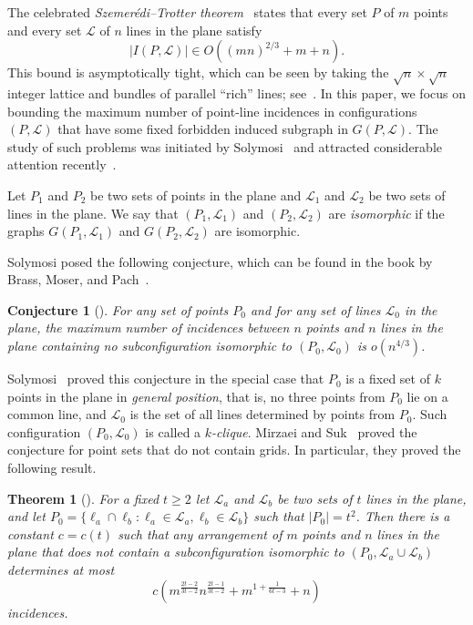\documentclass{article}
\newtheorem{theorem}{Theorem}
\newtheorem{conjecture}{Conjecture}
\begin{document}
The celebrated \emph{Szemer\'edi--Trotter theorem}~\cite{szemTro83} states that every set $P$ of $m$ points and every set $\mathcal{L}$ of $n$ lines in the plane satisfy
\[|I(P,\mathcal{L})| \in O((mn)^{2/3}+m+n).\]
This bound is asymptotically tight, which can be seen by taking the $\sqrt{n} \times \sqrt{n}$ integer lattice
and bundles of parallel ``rich'' lines; see~\cite{pachAga95}.
In this paper, we focus on bounding the maximum number of point-line incidences in configurations $(P,\mathcal{L})$ that have some fixed forbidden induced subgraph in $G(P,\mathcal{L})$.
The study of such problems was initiated by Solymosi~\cite{solymosi06} and attracted considerable attention recently~\cite{mirSuk21,mirSukVer19,tomSuk21,sukZeng23}.

Let $P_1$ and $P_2$ be two sets of points in the plane and $\mathcal{L}_1$ and $\mathcal{L}_2$ be two sets of lines in the plane.
We say that $(P_1,\mathcal{L}_1)$ and $(P_2,\mathcal{L}_2)$ are \emph{isomorphic} if the graphs $G(P_1,\mathcal{L}_1)$ and $G(P_2,\mathcal{L}_2)$ are isomorphic.

Solymosi posed the following conjecture, which can be found in the book by Brass, Moser, and Pach~\cite[p.~291]{bmp05}.

\begin{conjecture}[\cite{bmp05}]
\label{conj-Solymosi}
For any set of points $P_0$ and for any set of lines $\mathcal{L}_0$ in the plane, the maximum number of incidences between $n$ points and $n$ lines in the plane containing no subconfiguration isomorphic to $(P_0,\mathcal{L}_0)$ is $o(n^{4/3})$.
\end{conjecture}

Solymosi~\cite{solymosi06} proved this conjecture in the special case that $P_0$ is a fixed set of
$k$ points in the plane in \emph{general position}, that is, no three points from $P_0$ lie on a common line, and $\mathcal{L}_0$ is the set of all lines determined by points from $P_0$.
Such configuration $(P_0,\mathcal{L}_0)$ is called a \emph{$k$-clique}. 
Mirzaei and Suk~\cite{mirSuk21} proved the conjecture for point sets that do not contain grids. 
In particular, they proved the following result.

\begin{theorem}[\cite{mirSuk21}]
\label{thm-mirsuk}
For a fixed $t\geq 2$ let $\mathcal{L}_a$ and $\mathcal{L}_b$ be two sets of $t$ lines in the plane, and let $P_0=\{\ell_a\cap \ell_b : \ell_a\in \mathcal{L}_a, \ell_b\in \mathcal{L}_b\}$ such that $|P_0|=t^2$. Then there is a constant $c=c(t)$ such that any arrangement of $m$ points and $n$ lines in the plane that does not contain a subconfiguration isomorphic to $(P_0,\mathcal{L}_a\cup \mathcal{L}_b)$ determines at most \[c(m^{\frac{2t-2}{3t-2}}n^{\frac{2t-1}{3t-2}}+m^{1+\frac{1}{6t-3}}+n)\] incidences.
\end{theorem}
\end{document}
